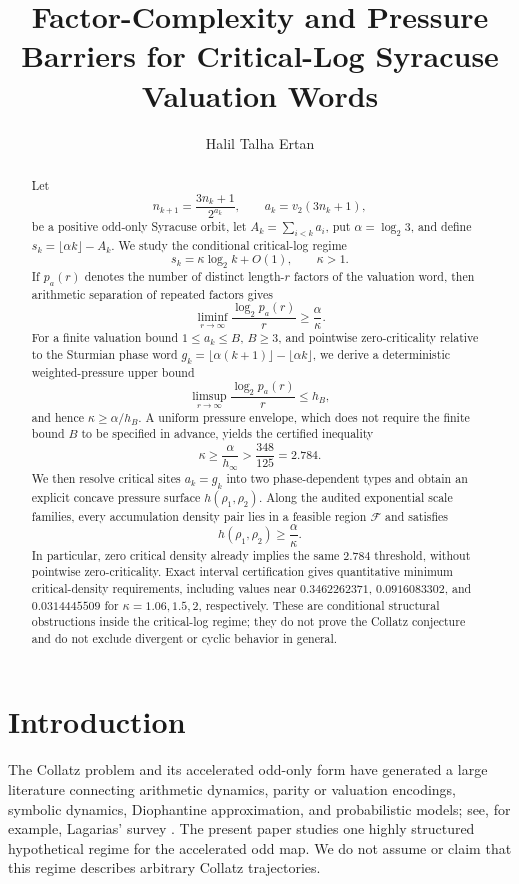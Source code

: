 \documentclass[11pt]{amsart}
\title[Factor-complexity and pressure barriers]{Factor-Complexity and Pressure Barriers for Critical-Log Syracuse Valuation Words}
\author{Halil Talha Ertan}
\date{}
\begin{document}
\begin{abstract}
Let
\[
 n_{k+1}=\frac{3n_k+1}{2^{a_k}},\qquad a_k=v_2(3n_k+1),
\]
be a positive odd-only Syracuse orbit, let
\(A_k=\sum_{i<k}a_i\), put \(\alpha=\log_2 3\), and define
\(s_k=\lfloor\alpha k\rfloor-A_k\).
We study the conditional critical-log regime
\[
 s_k=\kappa\log_2 k+O(1),\qquad \kappa>1.
\]
If \(p_a(r)\) denotes the number of distinct length-\(r\) factors of the valuation word, then arithmetic separation of repeated factors gives
\[
 \liminf_{r\to\infty}\frac{\log_2 p_a(r)}{r}\ge \frac{\alpha}{\kappa}.
\]
For a finite valuation bound \(1\le a_k\le B\), \(B\ge3\), and pointwise zero-criticality relative to the Sturmian phase word
\(g_k=\lfloor\alpha(k+1)\rfloor-\lfloor\alpha k\rfloor\), we derive a deterministic weighted-pressure upper bound
\[
 \limsup_{r\to\infty}\frac{\log_2 p_a(r)}{r}\le h_B,
\]
and hence \(\kappa\ge\alpha/h_B\).  A uniform pressure envelope, which does not require the finite bound \(B\) to be specified in advance, yields the certified inequality
\[
 \kappa\ge\frac{\alpha}{h_\infty}>\frac{348}{125}=2.784.
\]
We then resolve critical sites \(a_k=g_k\) into two phase-dependent types and obtain an explicit concave pressure surface \(h(\rho_1,\rho_2)\).  Along the audited exponential scale families, every accumulation density pair lies in a feasible region \(\mathcal F\) and satisfies
\[
 h(\rho_1,\rho_2)\ge\frac{\alpha}{\kappa}.
\]
In particular, zero critical density already implies the same \(2.784\) threshold, without pointwise zero-criticality.  Exact interval certification gives quantitative minimum critical-density requirements, including values near \(0.3462262371\), \(0.0916083302\), and \(0.0314445509\) for \(\kappa=1.06,1.5,2\), respectively.
These are conditional structural obstructions inside the critical-log regime; they do not prove the Collatz conjecture and do not exclude divergent or cyclic behavior in general.
\end{abstract}

\maketitle

\section{Introduction}

The Collatz problem and its accelerated odd-only form have generated a large literature connecting arithmetic dynamics, parity or valuation encodings, symbolic dynamics, Diophantine approximation, and probabilistic models; see, for example, Lagarias' survey \cite{Lagarias1985}.  The present paper studies one highly structured hypothetical regime for the accelerated odd map.  We do not assume or claim that this regime describes arbitrary Collatz trajectories.
\end{document}
